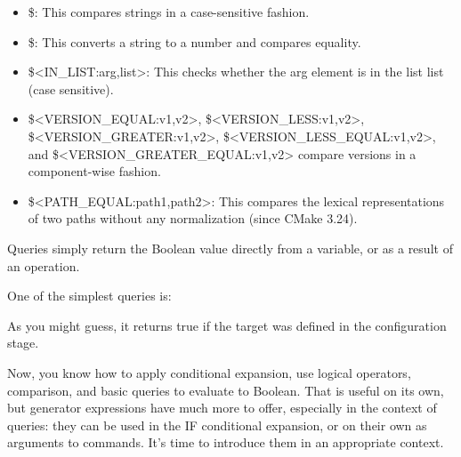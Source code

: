 \begin{itemize}
\item
\$<STREQUAL:arg1,arg2>: This compares strings in a case-sensitive fashion.

\item
\$<EQUAL:arg1,arg2>: This converts a string to a number and compares equality.

\item
\$<IN\_LIST:arg,list>: This checks whether the arg element is in the list list (case sensitive).

\item
\$<VERSION\_EQUAL:v1,v2>, \$<VERSION\_LESS:v1,v2>, \$<VERSION\_GREATER:v1,v2>, \$<VERSION\_LESS\_EQUAL:v1,v2>, and \$<VERSION\_GREATER\_EQUAL:v1,v2> compare versions in a component-wise fashion.

\item
\$<PATH\_EQUAL:path1,path2>: This compares the lexical representations of two paths without any normalization (since CMake 3.24).
\end{itemize}


Queries simply return the Boolean value directly from a variable, or as a result of an operation.

One of the simplest queries is:


As you might guess, it returns true if the target was defined in the configuration stage.

Now, you know how to apply conditional expansion, use logical operators, comparison, and basic queries to evaluate to Boolean. That is useful on its own, but generator expressions have much more to offer, especially in the context of queries: they can be used in the IF conditional expansion, or on their own as arguments to commands. It’s time to introduce them in an appropriate context.


